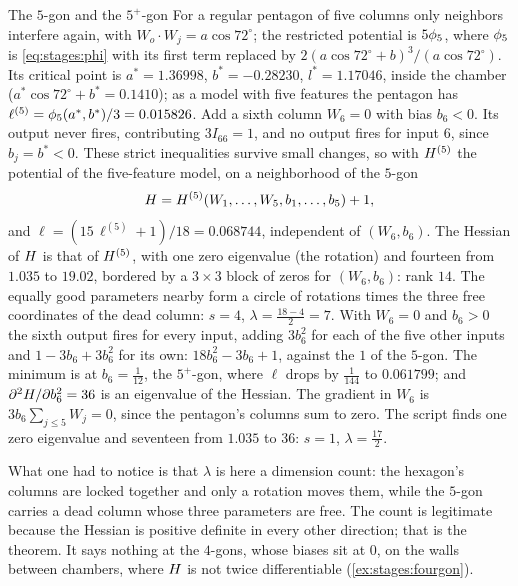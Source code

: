 \begin{refsection}
\begin{computation}{The $5$-gon and the $5^+$-gon}\label{comp:stages:pentagon}
\step For a regular pentagon of five columns only neighbors interfere again, with $W_o\cdot W_j=a\cos72^\circ$; the restricted potential is $5\phi_5$, where $\phi_5$ is \eqref{eq:stages:phi} with its first term replaced by $2(a\cos72^\circ+b)^3/(a\cos72^\circ)$. Its critical point is $a^*=1.36998$, $b^*=-0.28230$, $l^*=1.17046$, inside the chamber ($a^*\cos72^\circ+b^*=0.1410$); as a model with five features the pentagon has $\ell^{(5)}=\phi_5(a^*,b^*)/3=0.015826$.
\step Add a sixth column $W_6=0$ with bias $b_6<0$. Its output never fires, contributing $3I_{66}=1$, and no output fires for input $6$, since $b_j=b^*<0$. These strict inequalities survive small changes, so with $H^{(5)}$ the potential of the five-feature model, on a neighborhood of the $5$-gon
\[
H=H^{(5)}(W_1,\dots,W_5,b_1,\dots,b_5)+1,
\]
and $\ell=(15\,\ell^{(5)}+1)/18=0.068744$, independent of $(W_6,b_6)$.
\step The Hessian of $H$ is that of $H^{(5)}$, with one zero eigenvalue (the rotation) and fourteen from $1.035$ to $19.02$, bordered by a $3\times3$ block of zeros for $(W_6,b_6)$: rank $14$. The equally good parameters nearby form a circle of rotations times the three free coordinates of the dead column: $s=4$, $\lambda=\frac{18-4}2=7$.
\step With $W_6=0$ and $b_6>0$ the sixth output fires for every input, adding $3b_6^2$ for each of the five other inputs and $1-3b_6+3b_6^2$ for its own: $18b_6^2-3b_6+1$, against the $1$ of the $5$-gon. The minimum is at $b_6=\frac1{12}$, the $5^+$-gon, where $\ell$ drops by $\frac1{144}$ to $0.061799$; and $\partial^2H/\partial b_6^2=36$ is an eigenvalue of the Hessian.
\step The gradient in $W_6$ is $3b_6\sum_{j\le5}W_j=0$, since the pentagon's columns sum to zero. The script finds one zero eigenvalue and seventeen from $1.035$ to $36$: $s=1$, $\lambda=\frac{17}2$.
\end{computation}

What one had to notice is that $\lambda$ is here a dimension count: the hexagon's columns are locked together and only a rotation moves them, while the $5$-gon carries a dead column whose three parameters are free. The count is legitimate because the Hessian is positive definite in every other direction; that is the theorem. It says nothing at the $4$-gons, whose biases sit at $0$, on the walls between chambers, where $H$ is not twice differentiable (\cref{ex:stages:fourgon}).


\end{refsection}
